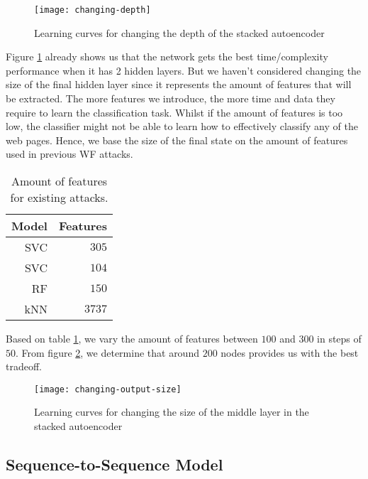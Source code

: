 \begin{figure}[ht]
  \centering
  \texttt{[image: changing-depth]}
  \caption{Learning curves for changing the depth of the stacked autoencoder}
  \label{fig:changing-depth}
\end{figure}

Figure \ref{fig:changing-depth} already shows us that the network gets the best time/complexity performance when it has 2 hidden layers.
But we haven't considered changing the size of the final hidden layer since it represents the amount of features that will be extracted.
The more features we introduce, the more time and data they require to learn the classification task.
Whilst if the amount of features is too low, the classifier might not be able to learn how to effectively classify any of the web pages.
Hence, we base the size of the final state on the amount of features used in previous WF attacks.

\begin{table}[ht]
  \centering
  \begin{tabular}{ r r } \hline
    \multicolumn{1}{c}{\textbf{Model}} & \multicolumn{1}{c}{\textbf{Features}} \\ \hline
    SVC \cite{panchenko1} & $305$ \\
    SVC \cite{panchenko2} & $104$ \\
    RF \cite{kfingerprinting} & $150$ \\
    kNN \cite{wang_cai_johnson_nithyanand_goldberg_2014} & $3737$ \\
    \hline
  \end{tabular}
  \caption{Amount of features for existing attacks.}
  \label{table:feature-wf-attacks}
\end{table}

Based on table \ref{table:feature-wf-attacks}, we vary the amount of features between $100$ and $300$ in steps of $50$.
From figure \ref{fig:changing-output-size}, we determine that around $200$ nodes provides us with the best tradeoff.

\begin{figure}[ht]
  \centering
  \texttt{[image: changing-output-size]}
  \caption{Learning curves for changing the size of the middle layer in the stacked autoencoder}
  \label{fig:changing-output-size}
\end{figure}

\newpage

\subsection{Sequence-to-Sequence Model}

